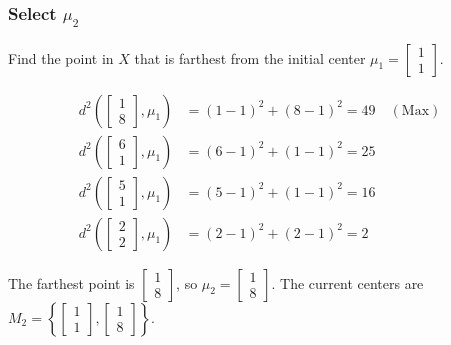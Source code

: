\documentclass{article}
\begin{document}
\subsubsection*{Select $\mu_2$}
\begin{flushleft}
Find the point in $X$ that is farthest from the initial center $\mu_1 = \begin{bmatrix}1 \\ 1\end{bmatrix}$. 
\end{flushleft}
\begin{align*}
    d^2\left(\begin{bmatrix}1 \\ 8\end{bmatrix}, \mu_1\right) &= (1-1)^2 + (8-1)^2 = 49 \quad (\text{Max}) \\
    d^2\left(\begin{bmatrix}6 \\ 1\end{bmatrix}, \mu_1\right) &= (6-1)^2 + (1-1)^2 = 25 \\
    d^2\left(\begin{bmatrix}5 \\ 1\end{bmatrix}, \mu_1\right) &= (5-1)^2 + (1-1)^2 = 16 \\
    d^2\left(\begin{bmatrix}2 \\ 2\end{bmatrix}, \mu_1\right) &= (2-1)^2 + (2-1)^2 = 2
\end{align*}
\begin{flushleft}
The farthest point is $\begin{bmatrix}1 \\ 8\end{bmatrix}$, so $\mu_2 = \begin{bmatrix}1 \\ 8\end{bmatrix}$. The current centers are $M_2 = \left\{\begin{bmatrix}1 \\ 1\end{bmatrix}, \begin{bmatrix}1 \\ 8\end{bmatrix}\right\}$.
\end{flushleft}
\end{document}

